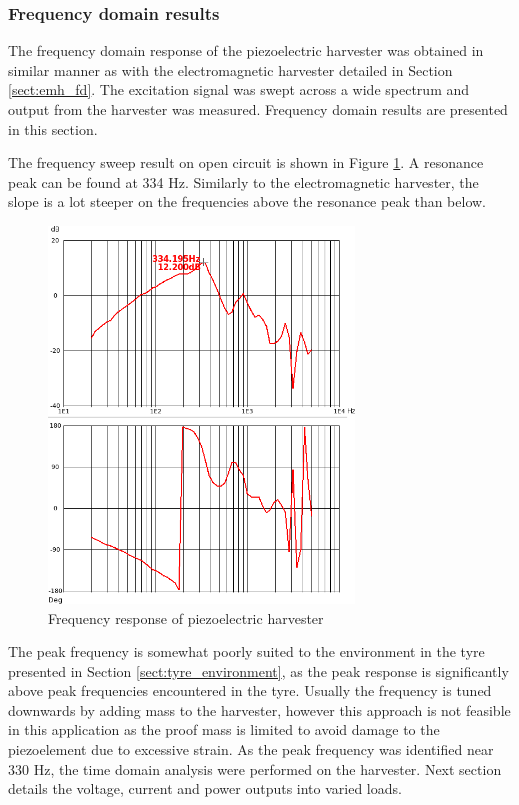 \subsubsection{Frequency domain results} \label{sect:piezo_fd}
The frequency domain response of the piezoelectric harvester was obtained in similar manner as with the electromagnetic harvester detailed in Section \ref{sect:emh_fd}. The excitation signal was swept across a wide spectrum and output from the harvester was measured. Frequency domain results are presented in this section.

The frequency sweep result on open circuit is shown in Figure \ref{fig:piezo_fd}. A resonance peak can be found at 334 Hz. Similarly to the electromagnetic harvester, the slope is a lot steeper on the frequencies above the resonance peak than below. 

\begin{figure}[htb]
\begin{center}
\includegraphics[height=10cm]{images/own_measurement/generator_shaker/piezo_fd_open_2_3.png}
\end{center}
\caption{\label{fig:piezo_fd} Frequency response of piezoelectric harvester}
\end{figure}


The peak frequency is somewhat poorly suited to the environment in the tyre presented in Section \ref{sect:tyre_environment}, as the peak response is significantly above peak frequencies encountered in the tyre. Usually the frequency is tuned downwards by adding mass to the harvester, however this approach is not feasible in this application as the proof mass is limited to avoid damage to the piezoelement due to excessive strain. As the peak frequency was identified near 330 Hz, the time domain analysis were performed on the harvester. Next section details the voltage, current and power outputs into varied loads.

